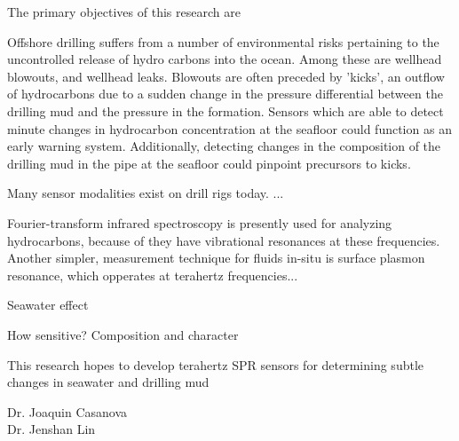 

The primary objectives of this research are


Offshore drilling suffers from a number of environmental risks pertaining to the uncontrolled release of hydro carbons into the ocean. Among these are wellhead blowouts, and wellhead leaks. Blowouts are often preceded by 'kicks', an outflow of hydrocarbons due to a sudden change in the pressure differential between the drilling mud and the pressure in the formation. Sensors which are able to detect minute changes in hydrocarbon concentration at the seafloor could function as an early warning system. Additionally, detecting changes in the composition of the drilling mud in the pipe at the seafloor could pinpoint precursors to kicks.

Many sensor modalities exist on drill rigs today. ...

Fourier-transform infrared spectroscopy is presently used for analyzing hydrocarbons, because of they have vibrational resonances at these frequencies. Another simpler, measurement technique for fluids in-situ is surface plasmon resonance, which opperates at terahertz frequencies...

Seawater effect

How sensitive? Composition and character

This research hopes to develop terahertz SPR sensors for determining subtle changes in seawater and drilling mud



\begin{description}
\item[Dr. Joaquin Casanova]
\item[Dr. Jenshan Lin]
\item[]
\end{description}
